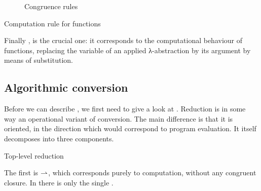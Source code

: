 \begin{figure}[h]
  \ContinuedFloat
  \caption{Congruence rules}
  \label{fig:cic-uconv-cong}
\end{figure}

\begin{marginfigure}
  \ContinuedFloat
  \begin{mathpar}
    \label{rule:cic-uconv-beta}
  \end{mathpar}
  \caption{Computation rule for functions}
\end{marginfigure}
Finally , is the crucial one:
it corresponds to the computational behaviour
of functions, replacing the variable of an applied λ-abstraction by its argument by
means of substitution.

\subsection{Algorithmic conversion}

Before we can describe , we first need
to give a look at . Reduction is in some way an operational variant of
conversion. The main difference is that it is oriented, in the direction which would
correspond to program evaluation. It itself decomposes into three components.

\begin{marginfigure}
  \ContinuedFloat*
  \begin{mathpar}
    \label{rule:beta-red}
  \end{mathpar}
  \caption{Top-level reduction}
\end{marginfigure}

The first is  $\tred$, which corresponds purely to computation, without any congruent closure.
In  there is only the single .

